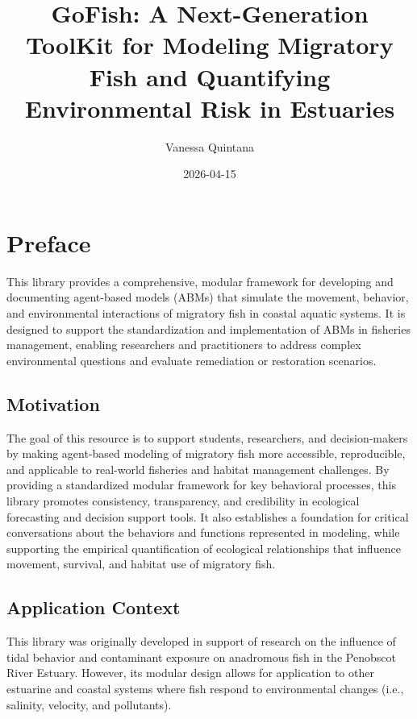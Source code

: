 \documentclass[
]{book}
\title{GoFish: A Next-Generation ToolKit for Modeling Migratory Fish and Quantifying Environmental Risk in Estuaries}
\author{Vanessa Quintana}
\date{2026-04-15}
\begin{document}
\maketitle

{
\setcounter{tocdepth}{1}
\tableofcontents
}
\chapter*{Preface}\label{preface}

This library provides a comprehensive, modular framework for developing and documenting agent-based models (ABMs) that simulate the movement, behavior, and environmental interactions of migratory fish in coastal aquatic systems. It is designed to support the standardization and implementation of ABMs in fisheries management, enabling researchers and practitioners to address complex environmental questions and evaluate remediation or restoration scenarios.

\section*{Motivation}\label{motivation}

The goal of this resource is to support students, researchers, and decision-makers by making agent-based modeling of migratory fish more accessible, reproducible, and applicable to real-world fisheries and habitat management challenges. By providing a standardized modular framework for key behavioral processes, this library promotes consistency, transparency, and credibility in ecological forecasting and decision support tools. It also establishes a foundation for critical conversations about the behaviors and functions represented in modeling, while supporting the empirical quantification of ecological relationships that influence movement, survival, and habitat use of migratory fish.

\section*{Application Context}\label{application-context}

This library was originally developed in support of research on the influence of tidal behavior and contaminant exposure on anadromous fish in the Penobscot River Estuary. However, its modular design allows for application to other estuarine and coastal systems where fish respond to environmental changes (i.e., salinity, velocity, and pollutants).
\end{document}
